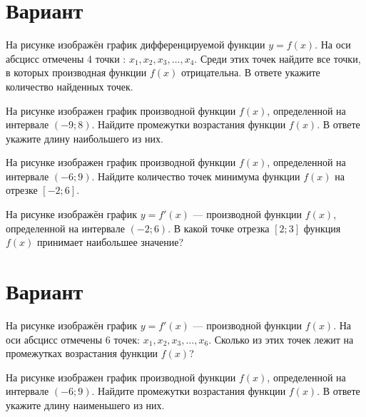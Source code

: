 \newpage\section{Вариант}\begin{taskBN}{1}
На рисунке изображён график дифференцируемой функции $y=f(x)$. На оси абсцисс отмечены 4 точки : $x_1, x_2, x_3, \dots, x_4$. Среди этих точек найдите все точки, в которых производная функции $f(x)$ отрицательна. В ответе укажите количество найденных точек.
\end{taskBN}

\begin{taskBN}{2}
На рисунке изображен график производной функции $f(x)$, определенной на интервале $(-9;8)$. Найдите промежутки возрастания функции $f(x)$. В ответе укажите длину наибольшего из них.
\end{taskBN}

\begin{taskBN}{3}
На рисунке изображен график производной функции $f(x)$, определенной на интервале $(-6;9)$. Найдите количество точек минимума функции $f(x)$ на отрезке $[-2;6]$. 
\end{taskBN}

\begin{taskBN}{4}
На рисунке изображён график $y=f'(x)$ — производной функции $f(x)$, определенной на интервале $(-2;6)$. В какой точке отрезка $[2; 3]$ функция $f(x)$ принимает наибольшее значение?
\end{taskBN}

\newpage\section{Вариант}\begin{taskBN}{1}
На рисунке изображён график $y=f'(x)$ — производной функции $f(x)$. На оси абсцисс отмечены 6 точек: $x_1, x_2, x_3, \dots, x_6$. Сколько из этих точек лежит на промежутках возрастания функции $f(x)$?
\end{taskBN}

\begin{taskBN}{2}
На рисунке изображен график производной функции $f(x)$, определенной на интервале $(-6;9)$. Найдите промежутки возрастания функции $f(x)$. В ответе укажите длину наименьшего из них.
\end{taskBN}

